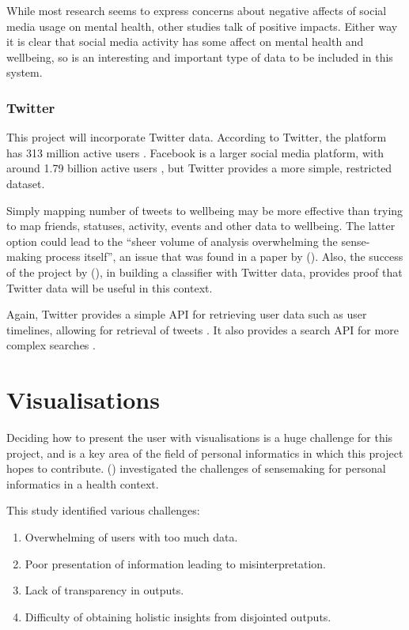 \documentclass[11pt,openright,a4paper]{report}
\begin{document}
While most research seems to express concerns about negative affects of social media usage on mental health, other studies talk of positive impacts. Either way it is clear that social media activity has some affect on mental health and wellbeing, so is an interesting and important type of data to be included in this system.

\subsubsection{Twitter}
This project will incorporate Twitter data. According to Twitter, the platform has 313 million active users \parencite{twitterabout}. Facebook is a larger social media platform, with around 1.79 billion active users \parencite{facebookusers}, but Twitter provides a more simple, restricted dataset.

Simply mapping number of tweets to wellbeing may be more effective than trying to map friends, statuses, activity, events and other data to wellbeing. The latter option could lead to the \enquote{sheer volume of analysis overwhelming the sense-making process itself}, an issue that was found in a paper by \citeauthor{jones2016sensemaking} (\citeyear{jones2016sensemaking}). Also, the success of the project by \citeauthor{de2013predicting} (\citeyear{de2013predicting}), in building a classifier with Twitter data, provides proof that Twitter data will be useful in this context.

Again, Twitter provides a simple API for retrieving user data such as user timelines, allowing for retrieval of tweets \parencite{twitterrestapi}. It also provides a search API for more complex searches \parencite{twittersearchapi}.

\section{Visualisations} \label{visualisations}
Deciding how to present the user with visualisations is a huge challenge for this project, and is a key area of the field of personal informatics in which this project hopes to contribute. \citeauthor{jones2016sensemaking} (\citeyear{jones2016sensemaking}) investigated the challenges of sensemaking for personal informatics in a health context.

This study identified various challenges:
\begin{enumerate}
\item Overwhelming of users with too much data.
\item Poor presentation of information leading to misinterpretation.
\item Lack of transparency in outputs.
\item Difficulty of obtaining holistic insights from disjointed outputs.
\end{enumerate}
\end{document}

